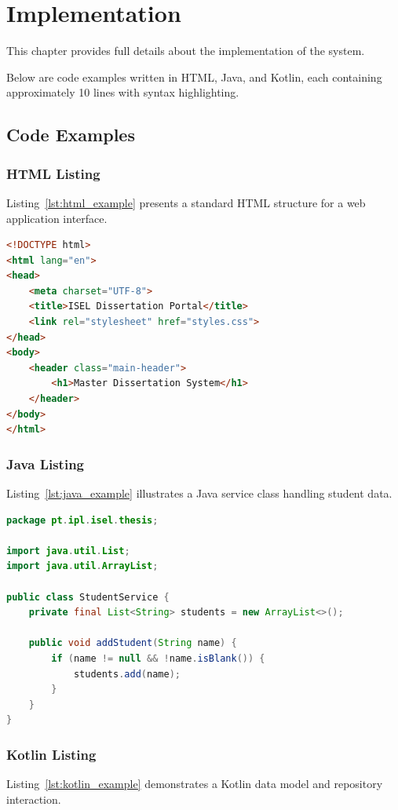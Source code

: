 \chapter{Implementation}

This chapter provides full details about the implementation of the system.

Below are code examples written in HTML, Java, and Kotlin, each containing approximately 10 lines with syntax highlighting.

\section{Code Examples}

\subsection{HTML Listing}
Listing~\ref{lst:html_example} presents a standard HTML structure for a web application interface.

\begin{lstlisting}[language=HTML, caption={Sample HTML structure for thesis dashboard.}, label={lst:html_example}]
<!DOCTYPE html>
<html lang="en">
<head>
    <meta charset="UTF-8">
    <title>ISEL Dissertation Portal</title>
    <link rel="stylesheet" href="styles.css">
</head>
<body>
    <header class="main-header">
        <h1>Master Dissertation System</h1>
    </header>
</body>
</html>
\end{lstlisting}

\subsection{Java Listing}
Listing~\ref{lst:java_example} illustrates a Java service class handling student data.

\begin{lstlisting}[language=Java, caption={Sample Java service implementation.}, label={lst:java_example}]
package pt.ipl.isel.thesis;

import java.util.List;
import java.util.ArrayList;

public class StudentService {
    private final List<String> students = new ArrayList<>();

    public void addStudent(String name) {
        if (name != null && !name.isBlank()) {
            students.add(name);
        }
    }
}
\end{lstlisting}

\subsection{Kotlin Listing}
Listing~\ref{lst:kotlin_example} demonstrates a Kotlin data model and repository interaction.

